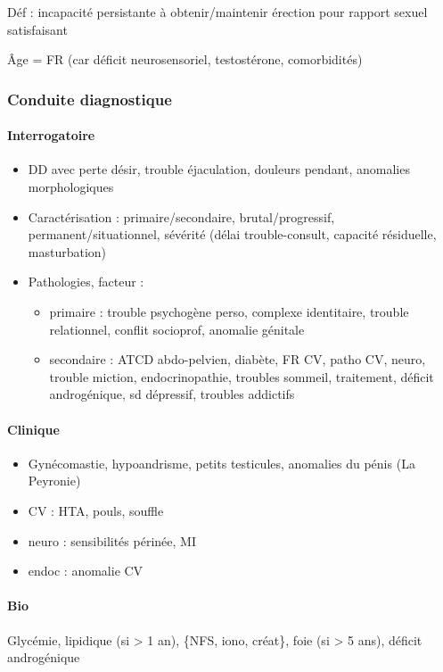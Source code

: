 \documentclass[11pt]{article}
\begin{document}
Déf : incapacité persistante à obtenir/maintenir érection pour rapport sexuel satisfaisant

Âge = FR (car déficit neurosensoriel, \inc testostérone, comorbidités)

\subsubsection{Conduite  diagnostique}
\label{sec:org621ff08}
\paragraph{Interrogatoire}
\label{sec:org8b9e8ad}
\begin{itemize}
\item DD avec perte désir, trouble éjaculation, douleurs pendant, anomalies morphologiques
\item Caractérisation : primaire/secondaire, brutal/progressif,
permanent/situationnel, sévérité (délai trouble-consult, capacité résiduelle,
masturbation)
\item Pathologies, facteur :
\begin{itemize}
\item primaire : trouble psychogène perso, complexe identitaire, trouble
relationnel, conflit socioprof, anomalie génitale
\item secondaire : ATCD abdo-pelvien, diabète, FR CV, patho CV, neuro, trouble
miction, endocrinopathie, troubles sommeil, traitement, déficit
androgénique, sd dépressif, troubles addictifs
\end{itemize}
\end{itemize}
\paragraph{Clinique}
\label{sec:org2d7456e}
\begin{itemize}
\item Gynécomastie, hypoandrisme, petits testicules, anomalies du pénis (La Peyronie)
\item CV : HTA, pouls, souffle
\item neuro : sensibilités périnée, MI
\item endoc : anomalie CV
\end{itemize}
\paragraph{Bio}
\label{sec:orgcd751f4}
Glycémie, lipidique (si > 1 an), \{NFS, iono, créat\}, foie (si > 5 ans), déficit
androgénique
\end{document}
